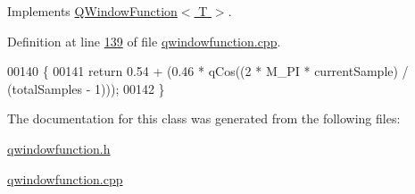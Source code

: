 Implements \hyperlink{a00071_ad58fa8c208b487dc2cbe765053228068}{Q\+Window\+Function$<$ T $>$}.



Definition at line \hyperlink{a00127_source_l00139}{139} of file \hyperlink{a00127_source}{qwindowfunction.\+cpp}.


\begin{DoxyCode}
00140 \{
00141     \textcolor{keywordflow}{return} 0.54 + (0.46 * qCos((2 * M\_PI * currentSample) / (totalSamples - 1)));
00142 \}
\end{DoxyCode}


The documentation for this class was generated from the following files\+:\begin{DoxyCompactItemize}
\item 
\hyperlink{a00128}{qwindowfunction.\+h}\item 
\hyperlink{a00127}{qwindowfunction.\+cpp}\end{DoxyCompactItemize}
